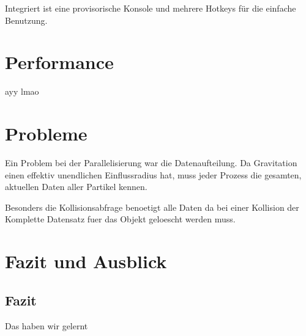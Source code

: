 Integriert ist eine provisorische Konsole und mehrere Hotkeys für die einfache Benutzung.

\section{Performance}
ayy lmao

\section{Probleme}
Ein Problem bei der Parallelisierung war die Datenaufteilung. Da Gravitation einen effektiv
unendlichen Einflussradius hat, muss jeder Prozess die gesamten, aktuellen Daten aller
Partikel kennen.

Besonders die Kollisionsabfrage benoetigt alle Daten da bei einer Kollision der Komplette
Datensatz fuer das Objekt geloescht werden muss.

\section{Fazit und Ausblick}
\subsection{Fazit}
Das haben wir gelernt
